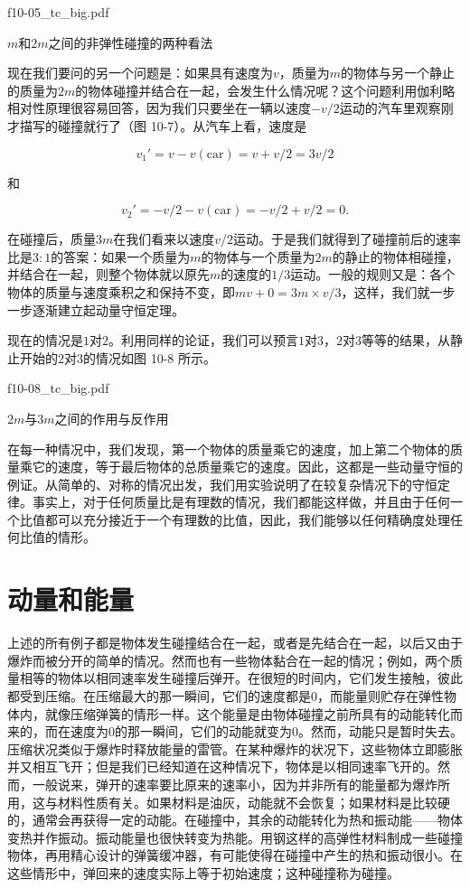 \documentclass[12pt,oneside]{book}
\begin{document}
\begin{fig}{f10-05_tc_big.pdf}
\caption{$m$和$2m$之间的非弹性碰撞的两种看法}
\label{fig:图10-7}
\end{fig}

现在我们要问的另一个问题是：如果具有速度为$v$，质量为$m$的物体与另一个静止的质量为$2m$的物体碰撞并结合在一起，会发生什么情况呢？这个问题利用伽利略相对性原理很容易回答，因为我们只要坐在一辆以速度$-v/2$运动的汽车里观察刚才描写的碰撞就行了（图 10-7）。从汽车上看，速度是

\begin{equation*}
v_1'=v-v(\text{car})=v+v/2=3v/2
\end{equation*}

和

\begin{equation*}
v_2'=-v/2-v(\text{car})=-v/2+v/2=0.
\end{equation*}

在碰撞后，质量$3m$在我们看来以速度$v/2$运动。于是我们就得到了碰撞前后的速率比是$3:1$的答案：如果一个质量为$m$的物体与一个质量为$2m$的静止的物体相碰撞，并结合在一起，则整个物体就以原先$m$的速度的$1/3$运动。一般的规则又是：各个物体的质量与速度乘积之和保持不变，即$mv + 0 = 3m \times v/3$，这样，我们就一步一步逐渐建立起动量守恒定理。

现在的情况是$1$对$2$。利用同样的论证，我们可以预言$1$对$3$，$2$对$3$等等的结果，从静止开始的$2$对$3$的情况如图 10-8 所示。

\begin{fig}{f10-08_tc_big.pdf}
\caption{$2m$与$3m$之间的作用与反作用}
\label{fig:图10-8}
\end{fig}


在每一种情况中，我们发现，第一个物体的质量乘它的速度，加上第二个物体的质量乘它的速度，等于最后物体的总质量乘它的速度。因此，这都是一些动量守恒的例证。从简单的、对称的情况出发，我们用实验说明了在较复杂情况下的守恒定律。事实上，对于任何质量比是有理数的情况，我们都能这样做，并且由于任何一个比值都可以充分接近于一个有理数的比值，因此，我们能够以任何精确度处理任何比值的情形。


\section{动量和能量}
上述的所有例子都是物体发生碰撞结合在一起，或者是先结合在一起，以后又由于爆炸而被分开的简单的情况。然而也有一些物体黏合在一起的情况；例如，两个质量相等的物体以相同速率发生碰撞后弹开。在很短的时间内，它们发生接触，彼此都受到压缩。在压缩最大的那一瞬间，它们的速度都是$0$，而能量则贮存在弹性物体内，就像压缩弹簧的情形一样。这个能量是由物体碰撞之前所具有的动能转化而来的，而在速度为$0$的那一瞬间，它们的动能就变为$0$。然而，动能只是暂时失去。压缩状况类似于爆炸时释放能量的雷管。在某种爆炸的状况下，这些物体立即膨胀并又相互飞开；但是我们已经知道在这种情况下，物体是以相同速率飞开的。然而，一般说来，弹开的速率要比原来的速率小，因为并非所有的能量都为爆炸所用，这与材料性质有关。如果材料是油灰，动能就不会恢复；如果材料是比较硬的，通常会再获得一定的动能。在碰撞中，其余的动能转化为热和振动能——物体变热并作振动。振动能量也很快转变为热能。用钢这样的高弹性材料制成一些碰撞物体，再用精心设计的弹簧缓冲器，有可能使得在碰撞中产生的热和振动很小。在这些情形中，弹回来的速度实际上等于初始速度；这种碰撞称为碰撞。
\end{document}
